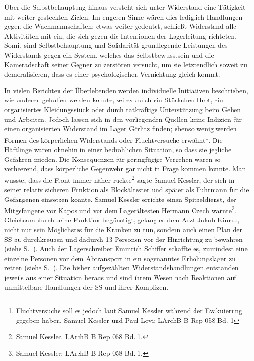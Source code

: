 \documentclass[a4paper,12pt,ngerman,
]{nisebook}
\begin{document}
Über die Selbstbehauptung hinaus versteht sich unter Widerstand eine Tätigkeit mit weiter gesteckten Zielen. Im engeren Sinne wären dies lediglich Handlungen gegen die Wachmannschaften; etwas weiter gedeutet, schließt Widerstand alle Aktivitäten mit ein, die sich gegen die Intentionen der Lagerleitung richteten. Somit sind Selbstbehauptung und Solidarität grundlegende Leistungen des Widerstands gegen ein System, welches das Selbstbewusstsein und die Kameradschaft seiner Gegner zu zerstören versucht, um sie letztendlich soweit zu demoralisieren, dass es einer psychologischen Vernichtung gleich kommt.

In vielen Berichten der Überlebenden werden individuelle Initiativen beschrieben, wie anderen geholfen werden konnte; sei es durch ein Stückchen Brot, ein organisiertes Kleidungsstück oder durch tatkräftige Unterstützung beim Gehen und Arbeiten. Jedoch lassen sich in den vorliegenden Quellen keine Indizien für einen organisierten Widerstand im Lager Görlitz finden; ebenso wenig werden Formen des körperlichen Widerstands oder Fluchtversuche erwähnt\footnote{Fluchtversuche soll es jedoch laut Samuel Kessler während der Evakuierung gegeben haben. Samuel Kessler und Paul Levi: LArchB B Rep 058 Bd. 1}. Die Häftlinge waren ohnehin in einer bedrohlichen Situation, so dass sie jegliche Gefahren mieden. Die Konsequenzen für geringfügige Vergehen waren so verheerend, dass körperliche Gegenwehr gar nicht in Frage kommen konnte. \glqq Man wusste, dass die Front immer näher rückte\grqq\footnote{Samuel Kessler. LArchB B Rep 058 Bd. 1.} sagte Samuel Kessler, der sich in seiner relativ sicheren Funktion als Blockältester und später als Fuhrmann für die Gefangenen einsetzen konnte. Samuel Kessler errichte einen Spitzeldienst, der Mitgefangene vor Kapos und vor dem Lagerältesten Hermann Czech warnte\footnote{Samuel Kessler: LArchB B Rep 058 Bd. 1.}. Gleichsam durch seine Funktion begünstigt, gelang es dem Arzt Jakob Kinrus, nicht nur sein Möglichstes für die Kranken zu tun, sondern auch einen Plan der SS zu durchkreuzen und dadurch 13 Personen vor der Hinrichtung zu bewahren (siehe S.~\pageref{widerstand_kinrus}). Auch der Lagerschreiber Emmrich Schiffer schaffte es, zumindest eine einzelne Personen vor dem Abtransport in ein sogenanntes Erholungslager zu retten (siehe S.~\pageref{widerstand_schiffer}). Die bisher aufgezählten Widerstandshandlungen entstanden jeweils aus einer Situation heraus und sind ihrem Wesen nach Reaktionen auf unmittelbare Handlungen der SS und ihrer Komplizen.
\end{document}
